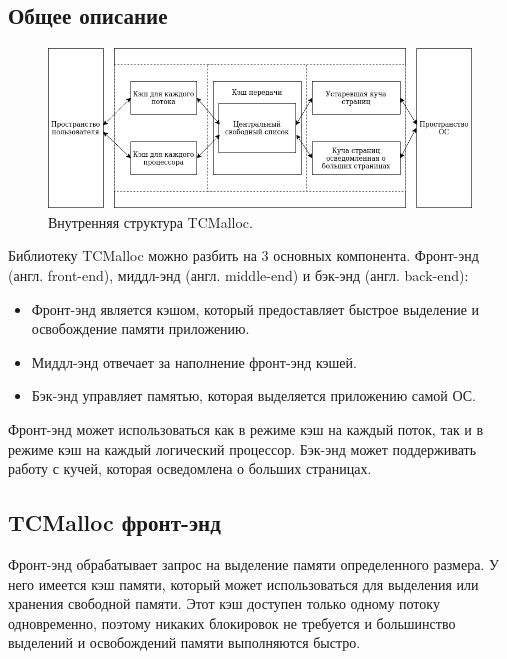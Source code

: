 \subsection{Общее описание}

\begin{figure}[!h]
	\begin{center}
		\includegraphics[scale=0.6]{images/tcmalloc-overview.png}
		\caption{Внутренняя структура TCMalloc.}
		\label{tcmalloc-overview}
	\end{center}
\end{figure}

Библиотеку TCMalloc можно разбить на 3 основных компонента. Фронт-энд (англ. front-end), миддл-энд (англ. middle-end) и бэк-энд (англ. back-end):
\begin{itemize}
	\item Фронт-энд является кэшом, который предоставляет быстрое выделение и освобождение памяти приложению.
	\item Миддл-энд отвечает за наполнение фронт-энд кэшей.
	\item Бэк-энд управляет памятью, которая выделяется приложению самой ОС.
\end{itemize}

Фронт-энд может использоваться как в режиме кэш на каждый поток, так и в режиме кэш на каждый логический процессор. Бэк-энд может поддерживать работу с кучей, которая осведомлена о больших страницах.

\subsection{TCMalloc фронт-энд}

Фронт-энд обрабатывает запрос на выделение памяти определенного размера. У него имеется кэш памяти, который может использоваться для выделения или хранения свободной памяти. Этот кэш доступен только одному потоку одновременно, поэтому никаких блокировок не требуется и большинство выделений и освобождений памяти выполняются быстро.

